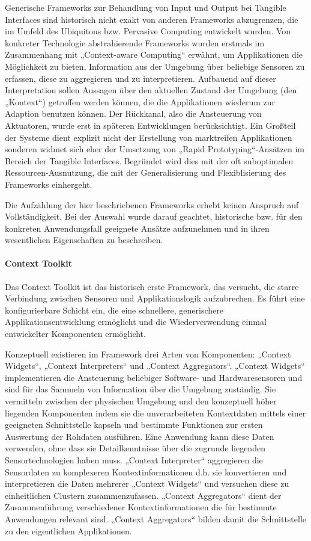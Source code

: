 Generische Frameworks zur Behandlung von Input und Output bei Tangible Interfaces sind historisch nicht exakt von anderen Frameworks abzugrenzen, die im Umfeld des Ubiquitous bzw. Pervasive Computing \citep{Weiser91} entwickelt wurden. Von konkreter Technologie abstrahierende Frameworks wurden erstmals im Zusammenhang mit „Context-aware Computing“ \citep{Schilit94} erwähnt, um Applikationen die Möglichkeit zu bieten, Information aus der Umgebung über beliebige Sensoren zu erfassen, diese zu aggregieren und zu interpretieren. Aufbauend auf dieser Interpretation sollen Aussagen über den aktuellen Zustand der Umgebung (den „Kontext“) getroffen werden können, die die Applikationen wiederum zur Adaption benutzen können. Der Rückkanal, also die Ansteuerung von Aktuatoren, wurde erst in späteren Entwicklungen berücksichtigt. Ein Großteil der Systeme dient explizit nicht der Erstellung von marktreifen Applikationen sonderen widmet sich eher der Umsetzung von „Rapid Prototyping“-Ansätzen im Bereich der Tangible Interfaces. Begründet wird dies mit der oft suboptimalen Ressourcen-Ausnutzung, die mit der Generalisierung und Flexiblisierung des Frameworks einhergeht. 

Die Aufzählung der hier beschriebenen Frameworks erhebt keinen Anspruch auf Vollständigkeit. Bei der Auswahl wurde darauf geachtet, historische bzw. für den konkreten Anwendungsfall geeignete Ansätze aufzunehmen und in ihren wesentlichen Eigenschaften zu beschreiben.

\paragraph{Context Toolkit} %
\label{par:context_toolkit}
 
Das Context Toolkit \citep{Dey01} ist das historisch erste Framework, das versucht, die starre Verbindung zwischen Sensoren und Applikationslogik aufzubrechen. Es führt eine konfigurierbare Schicht ein, die eine schnellere, generischere Applikationsentwicklung ermöglicht und die Wiederverwendung einmal entwickelter Komponenten ermöglicht.

Konzeptuell existieren im Framework drei Arten von Komponenten: „Context Widgets“, „Context Interpreters“ und „Context Aggregators“. „Context Widgets“ implementieren die Ansteuerung beliebiger Software- und Hardwaresensoren und sind für das Sammeln von Information über die Umgebung zuständig. Sie vermitteln zwischen der physischen Umgebung und den konzeptuell höher liegenden Komponenten indem sie die unverarbeiteten Kontextdaten mittels einer geeigneten Schnittstelle kapseln und bestimmte Funktionen zur ersten Auswertung der Rohdaten ausführen. Eine Anwendung kann diese Daten verwenden, ohne dass sie Detailkenntnisse über die zugrunde liegenden Sensortechnologien haben muss. „Context Interpreter“ aggregieren die Sensordaten zu komplexeren Kontextinformationen d.h. sie konvertieren und interpretieren die Daten mehrerer „Context Widgets“ und versuchen diese zu einheitlichen Clustern zusammenzufassen. „Context Aggregators“ dient der Zusammenführung verschiedener Kontextinformationen die für bestimmte Anwendungen relevant sind. „Context Aggregators“ bilden damit die Schnittstelle zu den eigentlichen Applikationen.

